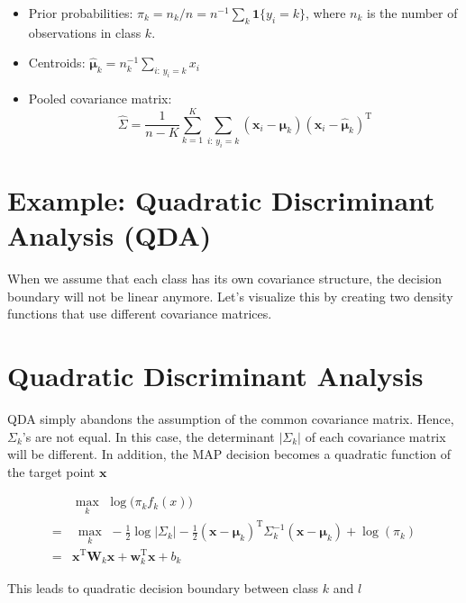 \documentclass[
]{book}
\providecommand{\tightlist}{%
  \setlength{\itemsep}{0pt}\setlength{\parskip}{0pt}}
\theoremstyle{definition}
\theoremstyle{definition}
\theoremstyle{definition}
\theoremstyle{definition}
\theoremstyle{remark}
\begin{document}
\begin{itemize}
\tightlist
\item
  Prior probabilities: \(\widehat{\pi}_k = n_k / n = n^{-1} \sum_k \mathbf{1}\{y_i = k\}\), where \(n_k\) is the number of observations in class \(k\).
\item
  Centroids: \(\widehat{\boldsymbol \mu}_k = n_k^{-1} \sum_{i: \,y_i = k} x_i\)
\item
  Pooled covariance matrix:
  \[\widehat \Sigma = \frac{1}{n-K} \sum_{k=1}^K \sum_{i : \, y_i = k} (\mathbf{x}_i - \widehat{\boldsymbol \mu}_k) (\mathbf{x}_i - \widehat{\boldsymbol \mu}_k)^\text{T}\]
\end{itemize}

\hypertarget{example-quadratic-discriminant-analysis-qda}{%
\section{Example: Quadratic Discriminant Analysis (QDA)}\label{example-quadratic-discriminant-analysis-qda}}

When we assume that each class has its own covariance structure, the decision boundary will not be linear anymore. Let's visualize this by creating two density functions that use different covariance matrices.

\hypertarget{quadratic-discriminant-analysis}{%
\section{Quadratic Discriminant Analysis}\label{quadratic-discriminant-analysis}}

QDA simply abandons the assumption of the common covariance matrix. Hence, \(\Sigma_k\)'s are not equal. In this case, the determinant \(|\Sigma_k|\) of each covariance matrix will be different. In addition, the MAP decision becomes a quadratic function of the target point \(\mathbf{x}\)

\begin{align}
 & \underset{k}{\max} \,\, \log \big( \pi_k f_k(x) \big) \\
=& ~\underset{k}{\max} \,\, -\frac{1}{2} \log |\Sigma_k| - \frac{1}{2} (\mathbf{x}- \boldsymbol \mu_k)^\text{T}\Sigma_k^{-1} (\mathbf{x}- \boldsymbol \mu_k) + \log(\pi_k) \\
=& \mathbf{x}^\text{T}\mathbf{W}_k \mathbf{x}+ \mathbf{w}_k^\text{T}\mathbf{x}+ b_k
\end{align}

This leads to quadratic decision boundary between class \(k\) and \(l\)
\end{document}
